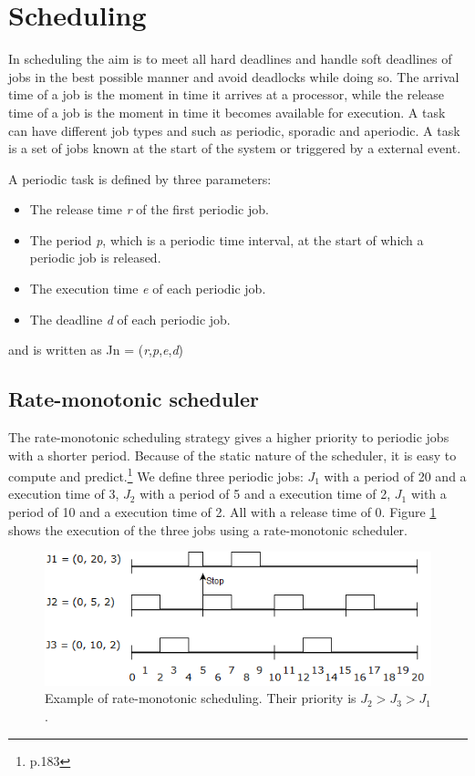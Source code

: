 \section{Scheduling} \label{sc:scheduling}
In scheduling the aim is to meet all hard deadlines and handle soft deadlines of jobs in the best possible manner and avoid deadlocks while doing so. The arrival time of a job is the moment in time it arrives at a processor, while the release time of a job is the moment in time it becomes available for execution. A task can have different job types and such as periodic, sporadic and aperiodic. A task is a set of jobs known at the start of the system or triggered by a external event.

A periodic task is defined by three parameters:
\begin{itemize}
	\itemsep0em
	\item The release time \textit{r} of the first periodic job.
	\item The period \textit{p}, which is a periodic time interval, at the start of which a periodic job is released.
	\item The execution time \textit{e} of each periodic job.
	\item The deadline \textit{d} of each periodic job.
\end{itemize}
and is written as Jn = (\textit{r},\textit{p},\textit{e},\textit{d})

\subsection{Rate-monotonic scheduler}
The rate-monotonic scheduling strategy gives a higher priority to periodic jobs with a shorter period. Because of the static nature of the scheduler, it is easy to compute and predict.\footnote{\cite{Fokkink1965} p.183}
We define three periodic jobs: $J_1$ with a period of 20 and a execution time of 3, $J_2$ with a period of 5 and a execution time of 2, $J_1$ with a period of 10 and a execution time of 2. All with a release time of 0. Figure \ref{fig:rateMonotonicExample} shows the execution of the three jobs using a rate-monotonic scheduler.

\begin{figure}[h!]\label{}
	\centering
	\includegraphics[scale=0.5]{realTimeComputing/fig/rate-mono.png}
	\caption{Example of rate-monotonic scheduling. Their priority is $J_2 > J_3 > J_1$. }
	\label{fig:rateMonotonicExample}
\end{figure}

